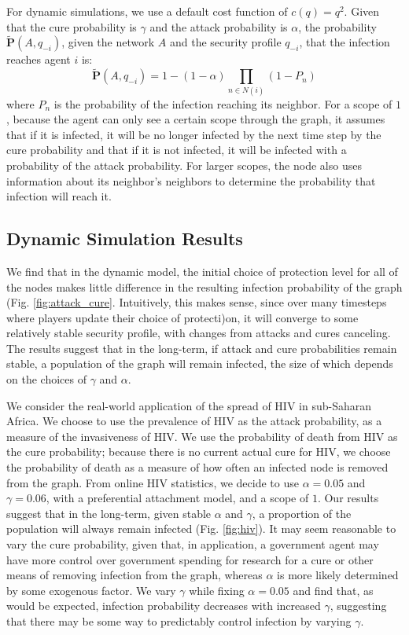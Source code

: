 \documentclass{article}
\theoremstyle{plain}
\begin{document}
For dynamic simulations, we use a default cost function of $c(q) = q^2$. Given that the cure probability is $\gamma$ and the attack probability is $\alpha$, the probability $\tilde{\textbf{P}}(A,q_{-i})$, given the network $A$ and the security profile $q_{-i}$, that the infection reaches agent $i$ is:
\begin{equation}
	\tilde{\textbf{P}}(A,q_{-i}) = 1 - (1 - \alpha) \prod_{n \in N(i)}{(1-P_n)}
\end{equation}
where $P_n$ is the probability of the infection reaching its neighbor. For a scope of $1$, because the agent can only see a certain scope through the graph, it assumes that if it is infected, it will be no longer infected by the next time step by the cure probability and that if it is not infected, it will be infected with a probability of the attack probability. For larger scopes, the node also uses information about its neighbor's neighbors to determine the probability that infection will reach it.

\subsection{Dynamic Simulation Results}

We find that in the dynamic model, the initial choice of protection level for all of the nodes makes little difference in the resulting infection probability of the graph (Fig. \ref{fig:attack_cure}. Intuitively, this makes sense, since over many timesteps where players update their choice of protecti)on, it will converge to some relatively stable security profile, with changes from attacks and cures canceling. The results suggest that in the long-term, if attack and cure probabilities remain stable, a population of the graph will remain infected, the size of which depends on the choices of $\gamma$ and $\alpha$.

We consider the real-world application of the spread of HIV in sub-Saharan Africa. We choose to use the prevalence of HIV as the attack probability, as a measure of the invasiveness of HIV. We use the probability of death from HIV as the cure probability; because there is no current actual cure for HIV, we choose the probability of death as a measure of how often an infected node is removed from the graph. From online HIV statistics, we decide to use $\alpha=0.05$ and $\gamma=0.06$, with a preferential attachment model, and a scope of $1$. Our results suggest that in the long-term, given stable $\alpha$ and $\gamma$, a proportion of the population will always remain infected (Fig. \ref{fig:hiv}). It may seem reasonable to vary the cure probability, given that, in application, a government agent may have more control over government spending for research for a cure or other means of removing infection from the graph, whereas $\alpha$ is more likely determined by some exogenous factor. We vary $\gamma$ while fixing $\alpha=0.05$ and find that, as would be expected, infection probability decreases with increased $\gamma$, suggesting that there may be some way to predictably control infection by varying $\gamma$.
\end{document}
